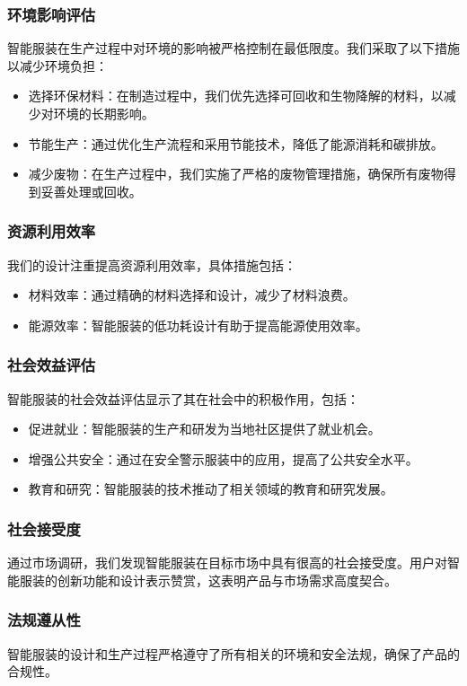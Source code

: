 \documentclass[12pt,hyperref,a4paper,UTF8]{ctexart}
\begin{document}
\subsubsection*{环境影响评估}
智能服装在生产过程中对环境的影响被严格控制在最低限度。我们采取了以下措施以减少环境负担：
\begin{itemize}
  \item 选择环保材料：在制造过程中，我们优先选择可回收和生物降解的材料，以减少对环境的长期影响。
  \item 节能生产：通过优化生产流程和采用节能技术，降低了能源消耗和碳排放。
  \item 减少废物：在生产过程中，我们实施了严格的废物管理措施，确保所有废物得到妥善处理或回收。
\end{itemize}

\subsubsection*{资源利用效率}
我们的设计注重提高资源利用效率，具体措施包括：
\begin{itemize}
  \item 材料效率：通过精确的材料选择和设计，减少了材料浪费。
  \item 能源效率：智能服装的低功耗设计有助于提高能源使用效率。
\end{itemize}

\subsubsection*{社会效益评估}
智能服装的社会效益评估显示了其在社会中的积极作用，包括：
\begin{itemize}
  \item 促进就业：智能服装的生产和研发为当地社区提供了就业机会。
  \item 增强公共安全：通过在安全警示服装中的应用，提高了公共安全水平。
  \item 教育和研究：智能服装的技术推动了相关领域的教育和研究发展。
\end{itemize}

\subsubsection*{社会接受度}
通过市场调研，我们发现智能服装在目标市场中具有很高的社会接受度。用户对智能服装的创新功能和设计表示赞赏，这表明产品与市场需求高度契合。

\subsubsection*{法规遵从性}
智能服装的设计和生产过程严格遵守了所有相关的环境和安全法规，确保了产品的合规性。
\end{document}
